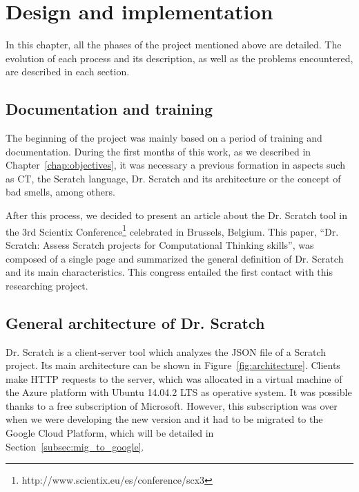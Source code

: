 

\cleardoublepage
\chapter{Design and implementation}
\label{chap:implementation}

In this chapter, all the phases of the project mentioned above are detailed. The evolution of each process and its description, as well as the problems encountered, are described in each section.

\section{Documentation and training}
\label{sec:documentation}

The beginning of the project was mainly based on a period of training and documentation. During the first months of this work, as we described in Chapter~\ref{chap:objectives}, it was necessary a previous formation in aspects such as CT, the Scratch language, Dr. Scratch and its architecture or the concept of bad smells, among others.

After this process, we decided to present an article about the Dr. Scratch tool in the 3rd Scientix Conference\footnote{http://www.scientix.eu/es/conference/scx3} celebrated in Brussels, Belgium. This paper, ``Dr. Scratch: Assess Scratch projects for Computational Thinking skills'', was composed of a single page and summarized the general definition of Dr. Scratch and its main characteristics. This congress entailed the first contact with this researching project. 

\section{General architecture of Dr. Scratch} 
\label{sec:arquitectura}

Dr. Scratch is a client-server tool which analyzes the JSON file of a Scratch project. Its main architecture can be shown in Figure~\ref{fig:architecture}. Clients make HTTP requests to the server, which was allocated in a virtual machine of the Azure platform with Ubuntu 14.04.2 LTS as operative system. It was possible thanks to a free subscription of Microsoft. However, this subscription was over when we were developing the new version and it had to be migrated to the Google Cloud Platform, which will be detailed in Section~\ref{subsec:mig_to_google}. 

